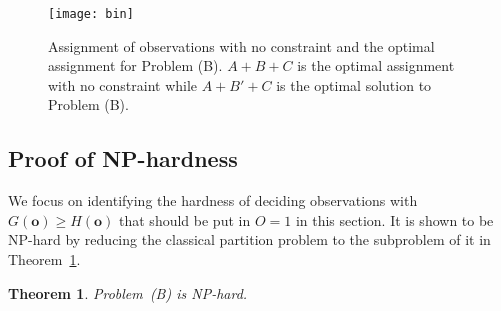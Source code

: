 \documentclass[conference]{IEEEtran}
\newtheorem{theorem}{Theorem}[section]
\begin{document}
\begin{figure}[tb]
    \begin{center}
    \setlength{\unitlength}{1in}
    \texttt{[image: bin]}
    \end{center}
\vspace{-1.2em}
\caption{Assignment of observations with no constraint and the optimal assignment for Problem (B). $A+B+C$ is the optimal assignment with no constraint while $A+B'+C$ is the optimal solution to Problem (B).}
\label{fig:bin}
\vspace{-1.5em}
\end{figure} 

\subsection{Proof of NP-hardness}
\label{subsec:NP}

We focus on identifying the hardness of deciding observations with $G(\boldsymbol{o})\ge H(\boldsymbol{o})$ that should be put in $O=1$ in this section. It is shown to be NP-hard by reducing the classical partition problem \cite{Garey} to the subproblem of it in Theorem~\ref{thm:NP}. 

\begin{theorem}
Problem~(B) is NP-hard.
\label{thm:NP}
\end{theorem}
\end{document}
